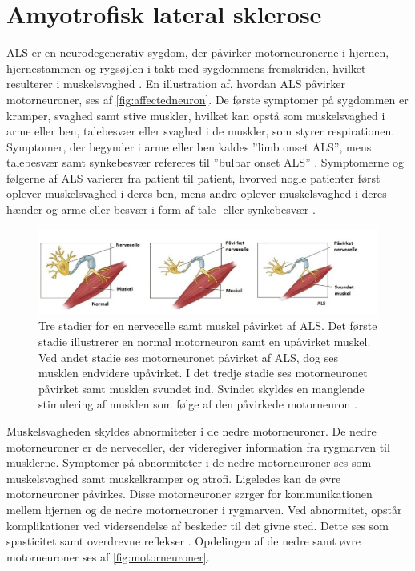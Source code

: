 \section{Amyotrofisk lateral sklerose} \label{sec:ALS}
ALS er en neurodegenerativ sygdom, der påvirker motorneuronerne i hjernen, hjernestammen og rygsøjlen i takt med sygdommens fremskriden, hvilket resulterer i muskelsvaghed \citep{henschke2012}. En illustration af, hvordan ALS påvirker motorneuroner, ses af \autoref{fig:affectedneuron}. De første symptomer på sygdommen er kramper, svaghed samt stive muskler, hvilket kan opstå som muskelsvaghed i arme eller ben, talebesvær eller svaghed i de muskler, som styrer respirationen. Symptomer, der begynder i arme eller ben kaldes ”limb onset ALS”, mens talebesvær samt synkebesvær refereres til ”bulbar onset ALS” \citep{nationalinstitute2016}. 
Symptomerne og følgerne af ALS varierer fra patient til patient, hvorved nogle patienter først oplever muskelsvaghed i deres ben, mens andre oplever muskelsvaghed i deres hænder og arme eller besvær i form af tale- eller synkebesvær \citep{miller2005, nationalinstitute2016}.

\begin{figure}[H]
\centering
\includegraphics[width=1\textwidth]{figures/affectedneuron}
\caption{Tre stadier for en nervecelle samt muskel påvirket af ALS. Det første stadie illustrerer en normal motorneuron samt en upåvirket muskel. Ved andet stadie ses motorneuronet påvirket af ALS, dog ses musklen endvidere upåvirket. I det tredje stadie ses motorneuronet påvirket samt musklen svundet ind. Svindet skyldes en manglende stimulering af musklen som følge af den påvirkede motorneuron \citep{drake2015}.}
\label{fig:affectedneuron}
\end{figure}
 
\noindent
Muskelsvagheden skyldes abnormiteter i de nedre motorneuroner. De nedre motorneuroner er de nerveceller, der videregiver information fra rygmarven til musklerne. Symptomer på abnormiteter i de nedre motorneuroner ses som muskelsvaghed samt muskelkramper og atrofi.
Ligeledes kan de øvre motorneuroner påvirkes. Disse motorneuroner sørger for kommunikationen mellem hjernen og de nedre motorneuroner i rygmarven. Ved abnormitet, opstår komplikationer ved vidersendelse af beskeder til det givne sted. Dette ses som spasticitet samt overdrevne reflekser \citep{nationalinstitute2016}. Opdelingen af de nedre samt øvre motorneuroner ses af \autoref{fig:motorneuroner}.

